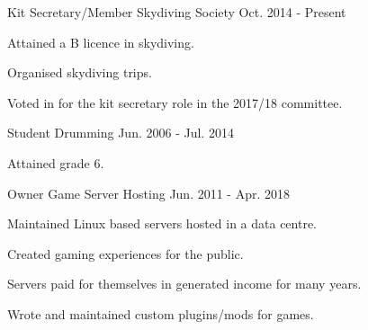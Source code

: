

\begin{cventries}

  \cventry
    {Kit Secretary/Member} %
    {Skydiving Society} %
    {} %
    {Oct. 2014 - Present} %
    {
      \begin{cvmitems} %
        \item {Attained a B licence in skydiving.}
        \item {Organised skydiving trips.}
        \item {Voted in for the kit secretary role in the 2017/18 committee.}
      \end{cvmitems}
    }

  \cventry
    {Student} %
    {Drumming} %
    {} %
    {Jun. 2006 - Jul. 2014} %
    {
      \begin{cvitems} %
        \item {Attained grade 6.}
      \end{cvitems}
    }

  \cventry
    {Owner} %
    {Game Server Hosting} %
    {} %
    {Jun. 2011 - Apr. 2018} %
    {
      \begin{cvmitems} %
        \item {Maintained Linux based servers hosted in a data centre.}
        \item {Created gaming experiences for the public.}
        \item {Servers paid for themselves in generated income for many years.}
        \item {Wrote and maintained custom plugins/mods for games.}
      \end{cvmitems}
    }

\end{cventries}
